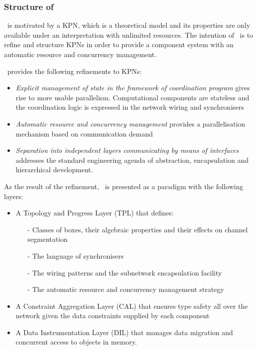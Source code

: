     \subsubsection{Structure of \ak\ }
\ak\ is motivated by a KPN, which is a theoretical model and its properties are only available under an interpretation with unlimited resources. The intention of \ak\ is to refine and structure KPNs in order to provide a component system with an automatic resource and concurrency management.

\ak\ provides the following refinements to KPNs:
\begin{itemize}
\item \emph{Explicit management of state in the framework of coordination program} gives rise to more usable parallelism. Computational components are stateless and the coordination logic is expressed in the network wiring and synchronisers

\item \emph{Automatic resource and concurrency management} provides a parallelisation mechanism based on communication demand

\item \emph{Separation into independent layers communicating by means of interfaces} addresses the standard engineering agenda of abstraction, encapsulation and hierarchical development.
\end{itemize}

As the result of the refinement, \ak\ is presented as a paradigm with the following layers:
\begin{itemize}
\item A Topology and Progress Layer (TPL) that defines:
    \begin{itemize}
\item[-] Classes of boxes, their algebraic properties and their effects on channel segmentation
\item[-] The language of synchronisers
\item[-] The wiring patterns and the subnetwork encapsulation facility
\item[-] The automatic resource and concurrency management strategy
    \end{itemize}

\item A Constraint Aggregation Layer (CAL) that ensures type safety all over the network given the data constraints supplied by each component

\item A Data Instrumentation Layer (DIL) that manages data migration and concurrent access to objects in memory.
\end{itemize}


